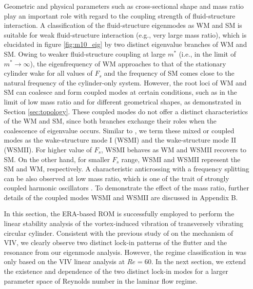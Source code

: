 \documentclass{jfm}
\begin{document}
Geometric and physical parameters such as cross-sectional shape and 
mass ratio play an important role with regard to the coupling strength 
of fluid-structure interaction. 
A classification of the fluid-structure eigenmodes as 
WM and SM is suitable for weak fluid-structure interaction 
(e.g., very large mass ratio), which is elucidated in figure \ref{fig:m10_eig} by two distinct 
eigenvalue branches of WM and SM. Owing to weaker fluid-structure coupling 
at large $m^*$ (i.e., in the limit of $m^* \to \infty$),  the eigenfrequency 
of WM approaches to that of the stationary cylinder wake for all values of $F_s$ and 
the frequency of SM comes close to the natural frequency of the cylinder-only system.
%
However, the root loci of WM and SM can coalesce   
and form coupled modes at certain conditions, such as in the limit of 
low mass ratio \citep{meliga2011,mittal2016} and for different geometrical shapes, 
as demonstrated in Section \ref{sec:topology}.
These coupled modes do not offer a distinct characteristics of the WM and SM, 
since both branches exchange their roles when the coalescence of eigenvalue occurs.
Similar to \cite{mittal2016}, we term these mixed or coupled modes 
as the wake-structure mode I (WSMI) and the wake-structure mode II (WSMII).
%
For higher value of $F_s$,  WSMI behaves as WM and WSMII recovers to SM.
On the other hand, for smaller $F_s$ range, WSMI and WSMII  represent the SM and
WM, respectively.
%
A characteristic anticrossing with a frequency splitting can be also observed at 
low mass ratio, which is one of the trait of strongly coupled harmonic oscillators 
\citep{novotny2010}.
%
To demonstrate the effect of the mass ratio,
further details of the coupled modes WSMI and WSMII are discussed in Appendix B.

In this section, the ERA-based ROM is successfully employed to perform 
the linear stability analysis of the vortex-induced vibration of transversely vibrating 
circular cylinder. Consistent with the previous study of \cite{Zhang2015} 
on the mechanism of VIV, we clearly observe two distinct lock-in patterns 
of the flutter and the resonance from our eigenmode analysis.
However, the regime classification in \cite{Zhang2015} was only based on 
the VIV linear analysis at $Re=60$. 
%
In the next section, we extend the existence and dependence of the two distinct lock-in modes 
for a larger parameter space of Reynolds number in the laminar flow regime.
\end{document}
